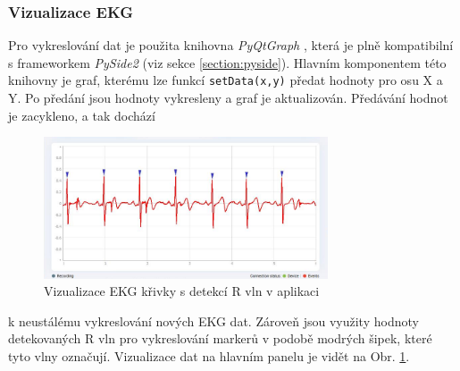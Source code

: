 \subsubsection{Vizualizace EKG}
\label{section:visual}
Pro vykreslování dat je použita knihovna \textit{PyQtGraph} \cite{PyQtGraph},
která je plně kompatibilní s frameworkem \textit{PySide2} (viz sekce
\ref{section:pyside}). Hlavním komponentem této knihovny je graf, kterému lze
funkcí \texttt{setData(x,y)} \cite{curveItem} předat hodnoty pro osu X a Y. Po
předání jsou hodnoty vykresleny a graf je aktualizován. Předávání hodnot je
zacykleno, a tak dochází 
\begin{figure}[H]
    \begin{center}
        \includegraphics[width=0.75\textwidth]{../assets/bbpm/r_detection}
        \caption{Vizualizace EKG křivky s detekcí R vln v aplikaci}
        \label{fig:app_ecg_visual}
    \end{center}
\end{figure}
\noindent k neustálému vykreslování nových EKG dat. Zároveň jsou využity hodnoty
detekovaných R vln pro vykreslování markerů v podobě modrých šipek, které tyto
vlny označují. Vizualizace dat na hlavním panelu je vidět na Obr.
\ref{fig:app_ecg_visual}.

